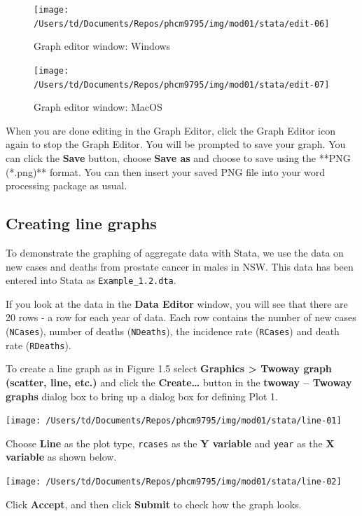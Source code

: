 \documentclass[
]{memoir}
\begin{document}
\begin{figure}
\texttt{[image: /Users/td/Documents/Repos/phcm9795/img/mod01/stata/edit-06]} \caption{Graph editor window: Windows}\label{fig:unnamed-chunk-43}
\end{figure}

\begin{figure}
\texttt{[image: /Users/td/Documents/Repos/phcm9795/img/mod01/stata/edit-07]} \caption{Graph editor window: MacOS}\label{fig:unnamed-chunk-44}
\end{figure}

When you are done editing in the Graph Editor, click the Graph Editor icon again to stop the Graph Editor. You will be prompted to save your graph. You can click the \textbf{Save} button, choose \textbf{Save as} and choose to save using the **PNG (*.png)** format. You can then insert your saved PNG file into your word processing package as usual.

\hypertarget{creating-line-graphs}{%
\subsection{Creating line graphs}\label{creating-line-graphs}}

To demonstrate the graphing of aggregate data with Stata, we use the data on new cases and deaths from prostate cancer in males in NSW. This data has been entered into Stata as \texttt{Example\_1.2.dta}.

If you look at the data in the \textbf{Data Editor} window, you will see that there are 20 rows - a row for each year of data. Each row contains the number of new cases (\texttt{NCases}), number of deaths (\texttt{NDeaths}), the incidence rate (\texttt{RCases}) and death rate (\texttt{RDeaths}).

To create a line graph as in Figure 1.5 select \textbf{Graphics \textgreater{} Twoway graph (scatter, line, etc.)} and click the \textbf{Create\ldots{}} button in the \textbf{twoway -- Twoway graphs} dialog box to bring up a dialog box for defining Plot 1.

\texttt{[image: /Users/td/Documents/Repos/phcm9795/img/mod01/stata/line-01]}

Choose \textbf{Line} as the plot type, \texttt{rcases} as the \textbf{Y variable} and \texttt{year} as the \textbf{X variable} as shown below.

\texttt{[image: /Users/td/Documents/Repos/phcm9795/img/mod01/stata/line-02]}

Click \textbf{Accept}, and then click \textbf{Submit} to check how the graph looks.
\end{document}
